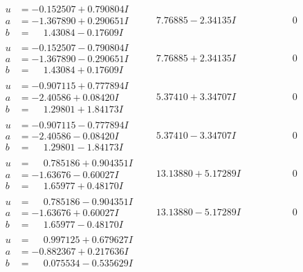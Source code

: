 \documentclass[1p]{elsarticle_modified}
\theoremstyle{definition}
\begin{document}
$$\begin{array}{c|c|c}
\begin{aligned}
u &= -0.152507 + 0.790804 I \\
a &= -1.367890 + 0.290651 I \\
b &= \phantom{-}1.43084 - 0.17609 I\end{aligned}
 & \phantom{-}7.76885 - 2.34135 I & \phantom{-0.000000 } 0 \\ \hline\begin{aligned}
u &= -0.152507 - 0.790804 I \\
a &= -1.367890 - 0.290651 I \\
b &= \phantom{-}1.43084 + 0.17609 I\end{aligned}
 & \phantom{-}7.76885 + 2.34135 I & \phantom{-0.000000 } 0 \\ \hline\begin{aligned}
u &= -0.907115 + 0.777894 I \\
a &= -2.40586 + 0.08420 I \\
b &= \phantom{-}1.29801 + 1.84173 I\end{aligned}
 & \phantom{-}5.37410 + 3.34707 I & \phantom{-0.000000 } 0 \\ \hline\begin{aligned}
u &= -0.907115 - 0.777894 I \\
a &= -2.40586 - 0.08420 I \\
b &= \phantom{-}1.29801 - 1.84173 I\end{aligned}
 & \phantom{-}5.37410 - 3.34707 I & \phantom{-0.000000 } 0 \\ \hline\begin{aligned}
u &= \phantom{-}0.785186 + 0.904351 I \\
a &= -1.63676 - 0.60027 I \\
b &= \phantom{-}1.65977 + 0.48170 I\end{aligned}
 & \phantom{-}13.13880 + 5.17289 I & \phantom{-0.000000 } 0 \\ \hline\begin{aligned}
u &= \phantom{-}0.785186 - 0.904351 I \\
a &= -1.63676 + 0.60027 I \\
b &= \phantom{-}1.65977 - 0.48170 I\end{aligned}
 & \phantom{-}13.13880 - 5.17289 I & \phantom{-0.000000 } 0 \\ \hline\begin{aligned}
u &= \phantom{-}0.997125 + 0.679627 I \\
a &= -0.882367 + 0.217636 I \\
b &= \phantom{-}0.075534 - 0.535629 I\end{aligned}

\end{array}$$
\end{document}
